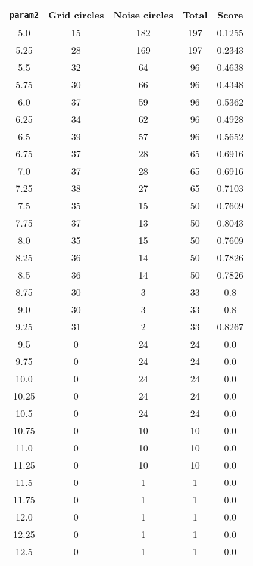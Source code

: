 \documentclass[letterpaper, 12pt]{article}
\begin{document}
\begin{longtable}{|c|c|c|c|c|}
\hline
\textbf{\texttt{param2}} & \textbf{Grid circles} & \textbf{Noise circles} & \textbf{Total} & \textbf{Score} \\
\hline
5.0 & 15 & 182 & 197 & 0.1255 \\
\hline
5.25 & 28 & 169 & 197 & 0.2343 \\
\hline
5.5 & 32 & 64 & 96 & 0.4638 \\
\hline
5.75 & 30 & 66 & 96 & 0.4348 \\
\hline
6.0 & 37 & 59 & 96 & 0.5362 \\
\hline
6.25 & 34 & 62 & 96 & 0.4928 \\
\hline
6.5 & 39 & 57 & 96 & 0.5652 \\
\hline
6.75 & 37 & 28 & 65 & 0.6916 \\
\hline
7.0 & 37 & 28 & 65 & 0.6916 \\
\hline
7.25 & 38 & 27 & 65 & 0.7103 \\
\hline
7.5 & 35 & 15 & 50 & 0.7609 \\
\hline
7.75 & 37 & 13 & 50 & 0.8043 \\
\hline
8.0 & 35 & 15 & 50 & 0.7609 \\
\hline
8.25 & 36 & 14 & 50 & 0.7826 \\
\hline
8.5 & 36 & 14 & 50 & 0.7826 \\
\hline
8.75 & 30 & 3 & 33 & 0.8 \\
\hline
9.0 & 30 & 3 & 33 & 0.8 \\
\hline
9.25 & 31 & 2 & 33 & 0.8267 \\
\hline
9.5 & 0 & 24 & 24 & 0.0 \\
\hline
9.75 & 0 & 24 & 24 & 0.0 \\
\hline
10.0 & 0 & 24 & 24 & 0.0 \\
\hline
10.25 & 0 & 24 & 24 & 0.0 \\
\hline
10.5 & 0 & 24 & 24 & 0.0 \\
\hline
10.75 & 0 & 10 & 10 & 0.0 \\
\hline
11.0 & 0 & 10 & 10 & 0.0 \\
\hline
11.25 & 0 & 10 & 10 & 0.0 \\
\hline
11.5 & 0 & 1 & 1 & 0.0 \\
\hline
11.75 & 0 & 1 & 1 & 0.0 \\
\hline
12.0 & 0 & 1 & 1 & 0.0 \\
\hline
12.25 & 0 & 1 & 1 & 0.0 \\
\hline
12.5 & 0 & 1 & 1 & 0.0 \\

\end{longtable}
\end{document}
